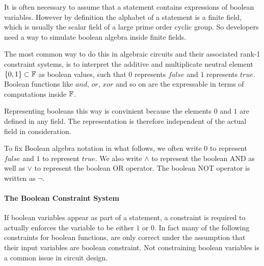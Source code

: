It is often necessary to assume that a statement contains expressions of boolean variables. However by definition the alphabet of a statement is a finite field, which is usually the scalar field of a large prime order cyclic group. So developers need a way to simulate boolean algebra inside finite fields.

The most common way to do this in algebraic circuits and their associated rank-1 constraint systems, is to interpret the additive and multiplicate neutral element $\{0,1\}\subset \mathbb{F}$ as boolean values, such that $0$ represents $false$ and $1$ represents $true$. Boolean functions like $and$, $or$, $xor$ and so on are the expressable in terms of computations inside $\mathbb{F}$. 

Representing booleans this way is convinient because the elements $0$ and $1$ are defined in any field. The representation is therefore independent of the actual field in consideration. 

To fix Boolean algebra notation in what follows, we often write $0$ to represent $false$ and $1$ to represent $true$. We also write $\wedge$ to represent the boolean AND as well as $\vee$ to represent the boolean OR operator. The boolean NOT operator is written as $\lnot$. 
\paragraph{The Boolean Constraint System}
If boolean variables appear as part of a statement, a constraint is required to actually enforces the variable to be either $1$ or $0$. In fact many of the following constraints for boolean functions, are only correct under the assumption that their input variables are boolean constraint. Not constraining boolean variables is a common issue in circuit design.

